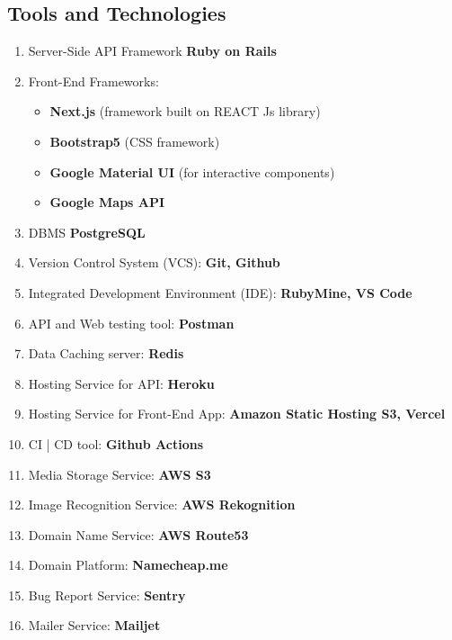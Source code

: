 \subsection{Tools and Technologies}
\begin{enumerate}
	\item Server-Side API Framework \textbf{Ruby on Rails}
	\item Front-End Frameworks:
	\begin{itemize}
		\item \textbf{Next.js} (framework built on REACT Js library)
		\item \textbf{Bootstrap5} (CSS framework)
		\item \textbf{Google Material UI} (for interactive components)
		\item \textbf{Google Maps API}
	\end{itemize}
	\item DBMS \textbf{PostgreSQL}
	\item Version Control System (VCS): \textbf{Git, Github}
	\item Integrated Development Environment (IDE): \textbf{RubyMine, VS Code}
	\item API and Web testing tool: \textbf{Postman}
	\item Data Caching server: \textbf{Redis}
	\item Hosting Service for API: \textbf{Heroku}
	\item Hosting Service for Front-End App: \textbf{Amazon Static Hosting S3, Vercel}
	\item CI | CD tool: \textbf{Github Actions}
	\item Media Storage Service: \textbf{AWS S3}
	\item Image Recognition Service: \textbf{AWS Rekognition}
	\item Domain Name Service: \textbf{AWS Route53}
	\item Domain Platform: \textbf{Namecheap.me}
	\item Bug Report Service: \textbf{Sentry}
	\item Mailer Service: \textbf{Mailjet}
	
\end{enumerate}

